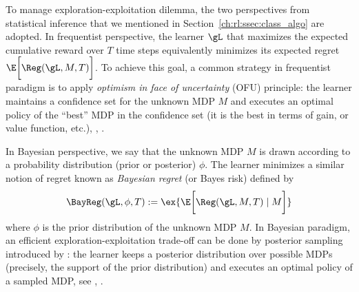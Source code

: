To manage exploration-exploitation dilemma, the two perspectives from statistical inference that we mentioned in Section~\ref{ch:rl:ssec:class_algo} are adopted. %
In frequentist perspective, the learner $\gL$ that maximizes the expected cumulative reward over $T$ time steps equivalently minimizes its expected regret $\E\bigg[\Reg(\gL, M, T)\bigg]$.
To achieve this goal, a common strategy in frequentist paradigm is to apply \emph{optimism in face of uncertainty} (OFU) principle: the learner maintains a confidence set for the unknown MDP $M$ and executes an optimal policy of the
“best” MDP in the confidence set (it is the best in terms of gain, or value function, etc.), \eg, \cite{jaksch2010near, filippi2010optimism, bartlett2012regal, azar2017minimax, fruit2017regret, jin2018q, fruit2018efficient, fruit2018near, zanette2019tighter, zhang2019regret, bourel2020tightening, ortner2020regret}.

In Bayesian perspective, we say that the unknown MDP $M$ is drawn according to a probability distribution (prior or posterior) $\phi$. %
The learner minimizes a similar notion of regret known as \emph{Bayesian regret} (or Bayes risk) defined by
\begin{equation}
    \label{eq:bayes_rg}
    \BayReg(\gL, \phi, T):=\ex{\E\bigg[\Reg(\gL, M, T) \mid M\bigg]}
\end{equation}
where $\phi$ is the prior distribution of the unknown MDP $M$.
In Bayesian paradigm, an efficient exploration-exploitation trade-off can be done by posterior sampling introduced by \cite{thompson1933likelihood}: the learner keeps a posterior distribution over possible MDPs (precisely, the support of the prior distribution) and executes an optimal policy of a sampled MDP, see \eg, \cite{osband2013more, gopalan2015thompson, ouyang2017learning}.

